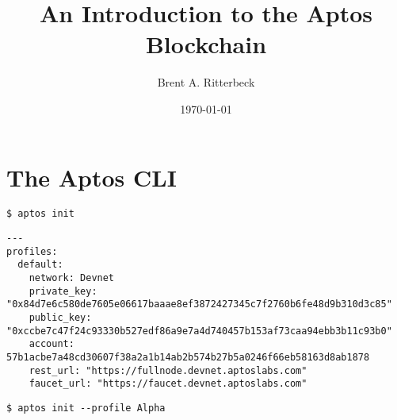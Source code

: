 \documentclass[10pt]{book}
\title{An Introduction to the Aptos Blockchain}
\author{Brent A. Ritterbeck}
\date{\today}
\theoremstyle{definition}
\theoremstyle{plain}
\begin{document}
\maketitle

\chapter{The Aptos CLI}

\begin{lstlisting}[caption={Creating a Default Profile}]
$ aptos init
\end{lstlisting}

\begin{lstlisting}[caption={Default Profile}]
---
profiles:
  default:
    network: Devnet
    private_key: "0x84d7e6c580de7605e06617baaae8ef3872427345c7f2760b6fe48d9b310d3c85"
    public_key: "0xccbe7c47f24c93330b527edf86a9e7a4d740457b153af73caa94ebb3b11c93b0"
    account: 57b1acbe7a48cd30607f38a2a1b14ab2b574b27b5a0246f66eb58163d8ab1878
    rest_url: "https://fullnode.devnet.aptoslabs.com"
    faucet_url: "https://faucet.devnet.aptoslabs.com"
\end{lstlisting}

\begin{lstlisting}[caption={Creating a Named Profile}]
$ aptos init --profile Alpha
\end{lstlisting}
\end{document}
